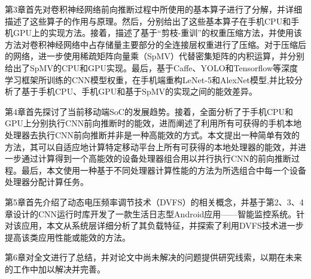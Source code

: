 第3章首先对卷积神经网络前向推断过程中所使用的基本算子进行了分解，并详细描述了这些算子的作用与原理。然后，分别给出了这些基本算子在手机CPU和手机GPU上的实现方法。接着，描述了基于“剪枝-重训”的权重压缩方法，并使用该方法对卷积神经网络中占存储量主要部分的全连接层权重进行了压缩。对于压缩后的网络，进一步使用稀疏矩阵向量乘（SpMV）代替密集矩阵的内积运算，并分别给出了SpMV的CPU和GPU实现。最后，基于Caffe、YOLO和Tensorflow等深度学习框架所训练的CNN模型权重，在手机端重构LeNet-5\cite{lecun1998gradient}和AlexNet\cite{krizhevsky2012imagenet}模型,并比较分析了基于手机CPU、手机GPU和基于SpMV的实现之间的能效差异。

第4章首先探讨了当前移动端SoC的发展趋势。接着，全面分析了于手机CPU和GPU上分别执行CNN前向推断时的能效，进而阐述了利用所有可获得的手机本地处理器去执行CNN前向推断并非是一种高能效的方式。本文提出一种简单有效的方法，其可以自适应地计算特定移动平台上所有可获得的本地处理器的能效，并进一步通过计算得到一个高能效的设备处理器组合用以并行执行CNN的前向推断过程。最后，本文使用一种基于不同处理器计算性能的方法为所选组合中每一个设备处理器分配计算任务。

第5章首先介绍了动态电压频率调节技术（DVFS）的相关概念，并基于第2、3、4章设计的CNN运行时库开发了一款生活日志型Android应用——智能监控系统。针对该应用，本文从系统层详细分析了其负载特征，并探索了利用DVFS技术进一步提高该类应用性能或能效的方法。

第6章对全文进行了总结，并对论文中尚未解决的问题提供研究线索，以期在未来的工作中加以解决并完善。

\cleardoublepage 